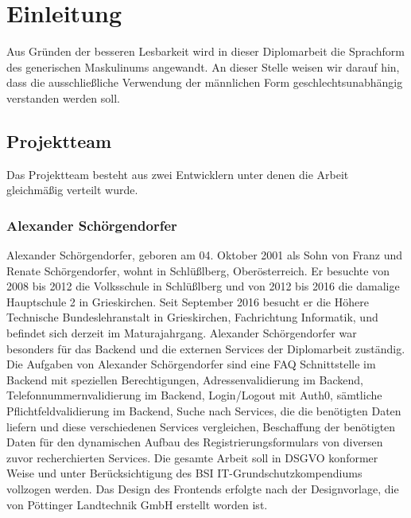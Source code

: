 \chapter{Einleitung} \label{sec:einleitung}
Aus Gründen der besseren Lesbarkeit wird in dieser Diplomarbeit die Sprachform des generischen Maskulinums angewandt. An dieser Stelle weisen wir darauf hin, dass die ausschließliche Verwendung der männlichen Form geschlechtsunabhängig verstanden werden soll.
\section{Projektteam}
Das Projektteam besteht aus zwei Entwicklern unter denen die Arbeit gleichmäßig verteilt wurde.
\subsection{Alexander Schörgendorfer}
Alexander Schörgendorfer, geboren am 04. Oktober 2001 als Sohn von Franz und Renate Schörgendorfer, wohnt in Schlüßlberg, Oberösterreich. Er besuchte von 2008 bis 2012 die Volksschule in Schlüßlberg und von 2012 bis 2016 die damalige Hauptschule 2 in Grieskirchen. Seit September 2016 besucht er die Höhere Technische Bundeslehranstalt in Grieskirchen, Fachrichtung Informatik, und befindet sich derzeit im Maturajahrgang. Alexander Schörgendorfer war besonders für das Backend und die externen Services der Diplomarbeit zuständig.\\
Die Aufgaben von Alexander Schörgendorfer sind eine FAQ Schnittstelle im Backend mit speziellen Berechtigungen, Adressenvalidierung im Backend, Telefonnummernvalidierung im Backend, Login/Logout mit Auth0, sämtliche Pflichtfeldvalidierung im Backend, Suche nach Services, die die benötigten Daten liefern und diese verschiedenen Services vergleichen, Beschaffung der benötigten Daten für den dynamischen Aufbau des Registrierungsformulars von diversen zuvor recherchierten Services. Die gesamte Arbeit soll in DSGVO konformer Weise und unter Berücksichtigung des BSI IT-Grundschutzkompendiums vollzogen werden. Das Design des Frontends erfolgte nach der Designvorlage, die von Pöttinger Landtechnik GmbH erstellt worden ist.

\newpage

